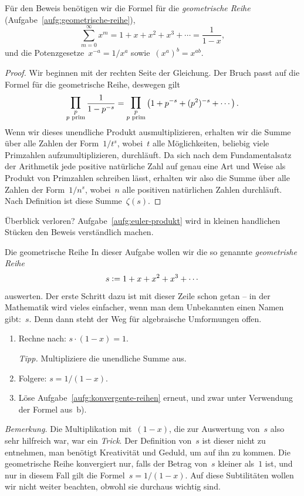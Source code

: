 \documentclass[twoside]{../zirkelblatt1415}
\theoremstyle{definition}
\theoremstyle{plain}
\theoremstyle{remark}
\newcommand{\defeq}{\vcentcolon=}
\newcommand{\prim}[1]{\text{\textnormal{$#1$ prim}}}
\newcommand{\bigprod}{\mathop{\mathlarger{\mathlarger{\prod}}}}
\begin{document}
Für den Beweis benötigen wir die Formel für die \emph{geometrische Reihe}
(Aufgabe~\ref{aufg:geometrische-reihe}),
\[ \sum_{m = 0}^\infty x^m = 1 + x + x^2 + x^3 + \cdots = \frac{1}{1 - x}, \]
und die Potenzgesetze~$x^{-a} = 1/x^a$ sowie~$(x^a)^b = x^{ab}$.

\begin{proof}Wir beginnen mit der rechten Seite der Gleichung. Der Bruch passt
auf die Formel für die geometrische Reihe, deswegen gilt
\[
  \bigprod_{\substack{p\\\prim{p}}} \frac{1}{1 - p^{-s}} =
  \bigprod_{\substack{p\\\prim{p}}} \left(1 + p^{-s} + (p^2)^{-s} + \cdots\right).
\]
Wenn wir dieses unendliche Produkt ausmultiplizieren, erhalten wir
die Summe über alle Zahlen der Form~$1/t^s$, wobei~$t$ alle Möglichkeiten,
beliebig viele Primzahlen aufzumultiplizieren, durchläuft. Da sich nach dem
Fundamentalsatz der Arithmetik jede positive natürliche Zahl auf genau eine Art
und Weise als Produkt von Primzahlen schreiben lässt, erhalten wir also die
Summe über alle Zahlen der Form~$1/n^s$, wobei~$n$ alle positiven natürlichen
Zahlen durchläuft. Nach Definition ist diese Summe~$\zeta(s)$.
\end{proof}

Überblick verloren? Aufgabe~\ref{aufg:euler-produkt} wird in kleinen handlichen
Stücken den Beweis verständlich machen.

\begin{aufgabe}{Die geometrische Reihe}\label{aufg:geometrische-reihe}
In dieser Aufgabe wollen wir die so genannte \emph{geometrishe Reihe}
\[ s \defeq 1 + x + x^2 + x^3 + \cdots \]
auswerten. Der erste Schritt dazu ist mit dieser Zeile schon getan -- in der
Mathematik wird vieles einfacher, wenn man dem Unbekannten einen Namen
gibt:~$s$. Denn dann steht der Weg für algebraische Umformungen offen.
\begin{enumerate}
\item Rechne nach: $s \cdot (1 - x) = 1$.

\emph{Tipp.} Multipliziere die unendliche Summe aus.

\item Folgere: $s = 1/(1-x)$.

\item Löse Aufgabe~\ref{aufg:konvergente-reihen} erneut, und zwar unter
Verwendung der Formel aus~b).
\end{enumerate}

\emph{Bemerkung.} Die Multiplikation mit~$(1-x)$, die zur Auswertung von~$s$
also sehr hilfreich war, war ein \emph{Trick}. Der Definition von~$s$ ist
dieser nicht zu entnehmen, man benötigt Kreativität und Geduld, um auf ihn zu
kommen. Die geometrische Reihe konvergiert nur, falls der Betrag von~$s$
kleiner als~$1$ ist, und nur in diesem Fall gilt die Formel~$s = 1/(1-x)$. Auf
diese Subtilitäten wollen wir nicht weiter beachten, obwohl sie durchaus
wichtig sind.
\end{aufgabe}
\end{document}
